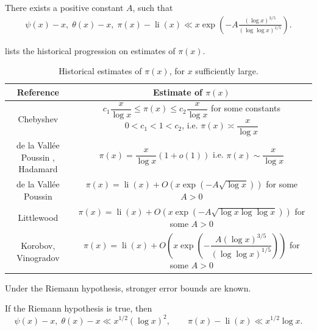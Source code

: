 \begin{theorem}
There exists a positive constant $A$, such that
\begin{align*}
\psi(x) - x, \; \theta(x) - x, \; \pi(x) - \operatorname{li}(x) \ll x\exp\left(-A\frac{(\log x)^{3/5}}{(\log\log x)^{1/5}}\right).
\end{align*}
\end{theorem}

 lists the historical progression on estimates of $\pi(x)$.

\begin{table}[ht]
    \caption{Historical estimates of $\pi(x)$, for $x$ sufficiently large.}
    \label{prime-error-table}
    \centering
    \renewcommand{\arraystretch}{2.2}
    \begin{tabular}{|c|c|}
    \hline
    Reference & Estimate of $\pi(x)$\\
    \hline
    Chebyshev & $c_1 \dfrac{x}{\log x} \leq \pi(x) \leq c_2 \dfrac{x}{\log x}$ for some constants $0 < c_1 < 1 < c_2$, i.e. $\pi(x) \asymp \dfrac{x}{\log x}$\\
    \hline
    de la Vall\'{e}e Poussin \cite{de_la_vallee_poussin_recherches_1896}, Hadamard \cite{hadamard_distribution_1896} & $\pi(x) = \dfrac{x}{\log x}(1 + o(1))$ i.e. $\pi(x) \sim \dfrac{x}{\log x}$\\
    \hline
    de la Vall\'{e}e Poussin \cite{de_la_vallee_poussin_fonction_1899} & $\pi(x) = \operatorname{li}(x) + O(x\exp(-A\sqrt{\log x}))$ for some $A > 0$\\
    \hline
    Littlewood \cite{littlewood_researches_1922} & $\pi(x) = \operatorname{li}(x) + O(x\exp(-A\sqrt{\log x\log\log x}))$ for some $A > 0$\\
    \hline 
    Korobov, Vinogradov \cite{vinogradov_eine_1958} & $\pi(x) = \operatorname{li}(x) + O\left(x\exp\left(-\dfrac{A(\log x)^{3/5}}{(\log\log x)^{1/5}}\right)\right)$ for some $A > 0$\\
    \hline
    \end{tabular}
\end{table}

Under the Riemann hypothesis, stronger error bounds are known. 
\begin{theorem}
If the Riemann hypothesis is true, then
\[
\psi(x) - x,\; \theta(x) - x \ll x^{1/2}(\log x)^2,\qquad \pi(x) - \operatorname{li}(x) \ll x^{1/2}\log x.
\]
\end{theorem}

